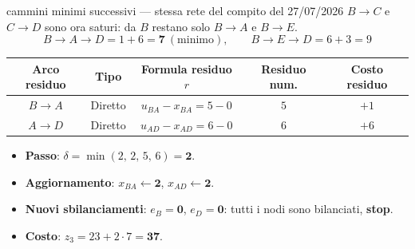 \documentclass[11pt,a4paper]{article}
\newcommand{\mcfnodes}{%
  \node[nd] (A) at (0,2.1) {$A$};
  \node[nd] (B) at (0,-2.1) {$B$};
  \node[nd] (C) at (3.0,0) {$C$};
  \node[nd] (D) at (6.0,2.1) {$D$};
  \node[nd] (E) at (6.0,-2.1) {$E$};}
\newcommand{\ra}[4]{\draw[#1,thick,black!65] (#2) -- node[font=\scriptsize,black!70,fill=amber!5,inner sep=1pt]{$#4$} (#3);}
\newcommand{\cy}[3]{\draw[->,line width=1.2pt,crimson] (#1) to[bend left=16] node[font=\scriptsize,crimson,fill=amber!5,inner sep=1pt]{$#3$} (#2);}
\newcommand{\fa}[4]{\draw[->,thick,black!45] (#1) -- node[font=\scriptsize,black!55,sloped,above,inner sep=1.5pt]{$#3$} node[font=\small,teal,sloped,below,inner sep=1.5pt]{$\mathbf{#4}$} (#2);}
\begin{document}
\begin{es}{cammini minimi successivi --- stessa rete del compito del 27/07/2026}
$B\to C$ e $C\to D$ sono ora saturi: da $B$ restano solo $B\to A$ e $B\to E$.
\[
B\!\to\!A\!\to\!D = 1+6 = \mathbf{7}\ (\text{minimo}),\qquad B\!\to\!E\!\to\!D = 6+3 = 9
\]
\begin{center}
\small
\begin{tabular}{@{}ccccc@{}}
\toprule
\textbf{Arco residuo} & \textbf{Tipo} & \textbf{Formula residuo $r$} & \textbf{Residuo num.} & \textbf{Costo residuo}\\
\midrule
$B \to A$ & Diretto & $u_{BA}-x_{BA} = 5-0$ & $5$ & $+1$\\
$A \to D$ & Diretto & $u_{AD}-x_{AD} = 6-0$ & $6$ & $+6$\\
\bottomrule
\end{tabular}
\end{center}
\begin{itemize}[itemsep=0.15em]
\item \textbf{Passo}: $\delta = \min(2,\,2,\,5,\,6) = \mathbf{2}$.
\item \textbf{Aggiornamento}: $x_{BA}\leftarrow \mathbf{2}$, \quad $x_{AD}\leftarrow \mathbf{2}$.
\item \textbf{Nuovi sbilanciamenti}: $e_B = \mathbf{0}$, \quad $e_D = \mathbf{0}$: tutti i nodi sono bilanciati, \textbf{stop}.
\item \textbf{Costo}: $z_3 = 23 + 2\cdot 7 = \mathbf{37}$.
\end{itemize}

\begin{center}
\begin{minipage}[t]{0.48\textwidth}\centering
{}
\par\vspace{1mm}{\scriptsize $G_x$ post it. 2: evidenziato $B\to A\to D$ ($c=7$, $\delta=2$)}
\end{minipage}\hfill
\begin{minipage}[t]{0.48\textwidth}\centering
{}
\par{}
\end{minipage}
\end{center}


\end{es}
\end{document}
